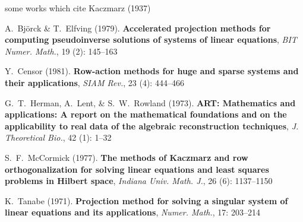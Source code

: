 \documentclass[usepdftitle=false,usenames,dvipsnames]{beamer}
\begin{document}
\begin{frame}{some works which cite Kaczmarz (1937)}

\begin{thebibliography}{1}
 {\footnotesize A.~Bj\"orck \& T.~Elfving (1979). \textbf{Accelerated projection methods for computing pseudoinverse solutions of systems of linear equations}, \emph{BIT Numer. Math.}, 19 (2): 145--163}

 {\footnotesize Y.~Censor (1981). \textbf{Row-action methods for huge and sparse systems and their applications}, \emph{SIAM Rev.}, 23 (4): 444--466}

 {\footnotesize G.~T.~Herman, A.~Lent, \& S.~W.~Rowland (1973). \textbf{ART: Mathematics and applications: A report on the mathematical foundations and on the applicability to real data of the algebraic reconstruction techniques}, \emph{J. Theoretical Bio.}, 42 (1): 1--32}

 {\footnotesize S.~F.~McCormick (1977). \textbf{The methods of Kaczmarz and row orthogonalization for solving linear equations and least squares problems in Hilbert space}, \emph{Indiana Univ. Math. J.}, 26 (6): 1137--1150}

 {\footnotesize K.~Tanabe (1971). \textbf{Projection method for solving a singular system of linear equations and its applications}, \emph{Numer. Math.}, 17: 203--214}
\end{thebibliography}
\end{frame}
\end{document}
